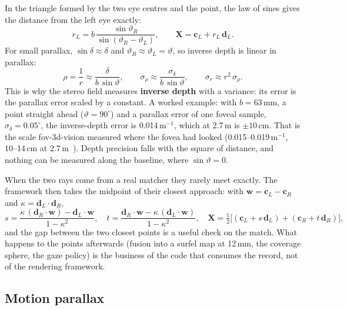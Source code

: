 \documentclass[11pt,a4paper]{article}
\newcommand{\vb}[1]{\mathbf{#1}}
\begin{document}
In the triangle formed by the two eye centres and the point, the law of sines gives the distance from the left
eye exactly:
\begin{equation}\label{eq:lawsines}
r_L = b\,\frac{\sin\vartheta_R}{\sin(\vartheta_R - \vartheta_L)}, \qquad \vb{X} = \vb{c}_L + r_L\,\vb{d}_L .
\end{equation}
For small parallax, $\sin\delta \approx \delta$ and $\vartheta_R \approx \vartheta_L = \vartheta$, so inverse
depth is linear in parallax:
\begin{equation}\label{eq:invdepth}
\rho = \frac{1}{r} \approx \frac{\delta}{b\,\sin\vartheta}, \qquad
\sigma_\rho \approx \frac{\sigma_\delta}{b\,\sin\vartheta}, \qquad
\sigma_r \approx r^2\,\sigma_\rho .
\end{equation}
This is why the stereo field measures \textbf{inverse depth} with a variance: its error is the parallax error
scaled by a constant. A worked example: with $b = 63$\,mm, a point straight ahead ($\vartheta = 90^\circ$) and a
parallax error of one foveal sample, $\sigma_\delta = 0.05^\circ$, the inverse-depth error is
0.014\,m$^{-1}$, which at 2.7\,m is $\pm 10$\,cm. That is the scale fov-3d-vision measured where the fovea had
looked (0.015--0.019\,m$^{-1}$, 10--14\,cm at 2.7\,m~\cite{fov3dC}). Depth precision falls with the square of
distance, and nothing can be measured along the baseline, where $\sin\vartheta = 0$.

When the two rays come from a real matcher they rarely meet exactly. The framework then takes the midpoint of
their closest approach: with $\vb{w} = \vb{c}_L - \vb{c}_R$ and $\kappa = \vb{d}_L\cdot\vb{d}_R$,
\begin{equation}\label{eq:midpoint}
s = \frac{\kappa\,(\vb{d}_R\cdot\vb{w}) - \vb{d}_L\cdot\vb{w}}{1-\kappa^2}, \quad
t = \frac{\vb{d}_R\cdot\vb{w} - \kappa\,(\vb{d}_L\cdot\vb{w})}{1-\kappa^2}, \quad
\vb{X} = \tfrac12\bigl[(\vb{c}_L + s\,\vb{d}_L) + (\vb{c}_R + t\,\vb{d}_R)\bigr],
\end{equation}
and the gap between the two closest points is a useful check on the match. What happens to the points afterwards
(fusion into a surfel map at 12\,mm, the coverage sphere, the gaze policy) is the business of the code that
consumes the record, not of the rendering framework.

\subsection{Motion parallax}\label{sec:parallax}
\end{document}
